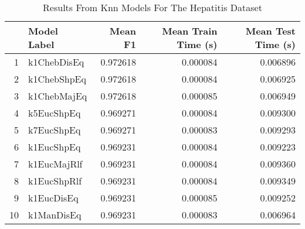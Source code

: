 \begin{table}
\centering
\caption{Results From Knn Models For The Hepatitis Dataset}
\label{tab:knn_results_hepatitis}
\begin{tabular}{rlrrr}
\toprule
 & Model Label & Mean F1 & Mean Train Time (s) & Mean Test Time (s) \\
\midrule
1 & k1ChebDisEq & 0.972618 & 0.000084 & 0.006896 \\
2 & k1ChebShpEq & 0.972618 & 0.000084 & 0.006925 \\
3 & k1ChebMajEq & 0.972618 & 0.000085 & 0.006949 \\
4 & k5EucShpEq & 0.969271 & 0.000084 & 0.009300 \\
5 & k7EucShpEq & 0.969271 & 0.000083 & 0.009293 \\
6 & k1EucShpEq & 0.969231 & 0.000084 & 0.009223 \\
7 & k1EucMajRlf & 0.969231 & 0.000084 & 0.009360 \\
8 & k1EucShpRlf & 0.969231 & 0.000084 & 0.009349 \\
9 & k1EucDisEq & 0.969231 & 0.000085 & 0.009252 \\
10 & k1ManDisEq & 0.969231 & 0.000083 & 0.006964 \\
\bottomrule
\end{tabular}
\end{table}
